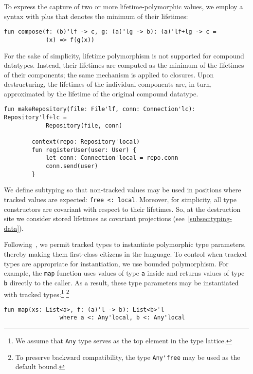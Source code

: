 \documentclass[11pt]{article}
\begin{document}
    To express the capture of two or more lifetime-polymorphic values, we employ a syntax with plus that denotes the minimum of their lifetimes:
    \begin{lstlisting}[language=colang]
        fun compose(f: (b)'lf -> c, g: (a)'lg -> b): (a)'lf+lg -> c =
            (x) => f(g(x))
    \end{lstlisting}

    For the sake of simplicity, lifetime polymorphism is not supported for compound datatypes.
    Instead, their lifetimes are computed as the minimum of the lifetimes of their components; the same mechanism is applied to closures.
    Upon destructuring, the lifetimes of the individual components are, in turn, approximated by the lifetime of the original compound datatype.
    \begin{lstlisting}[language=colang]
        fun makeRepository(file: File'lf, conn: Connection'lc): Repository'lf+lc =
            Repository(file, conn)

        context(repo: Repository'local)
        fun registerUser(user: User) {
            let conn: Connection'local = repo.conn
            conn.send(user)
        }
    \end{lstlisting}

    We define subtyping so that non-tracked values may be used in positions where tracked values are expected: \lstinline[language=colang]|free <: local|.
    Moreover, for simplicity, all type constructors are covariant with respect to their lifetimes.
    So, at the destruction site we consider stored lifetimes as covariant projections (see\ \ref{subsec:typing-data}). %

    Following~\cite{boruch2023capturing}, we permit tracked types to instantiate polymorphic type parameters, thereby making them first-class citizens in the language.
    To control when tracked types are appropriate for instantiation, we use bounded polymorphism.
    For example, the \lstinline[language=colang]|map| function uses values of type \lstinline[language=colang]|a| inside and returns values of type \lstinline[language=colang]|b| directly to the caller.
    As a result, these type parameters may be instantiated with tracked types:\footnote{We assume that \lstinline[language=colang]|Any| type serves as the top element in the type lattice.} \footnote{To preserve backward compatibility, the type \lstinline[language=colang]|Any'free| may be used as the default bound.}
    \begin{lstlisting}[language=colang]
        fun map(xs: List<a>, f: (a)'l -> b): List<b>'l
                where a <: Any'local, b <: Any'local
    \end{lstlisting}
\end{document}
